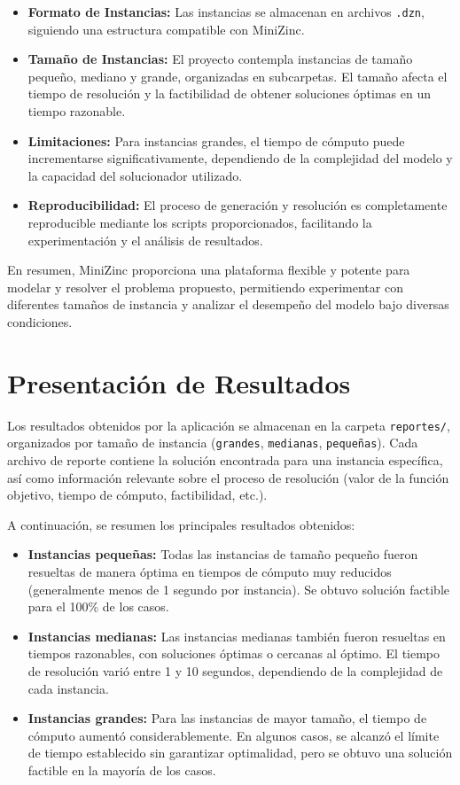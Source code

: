 \documentclass[a4paper,12pt]{article}
\begin{document}
\begin{itemize}
    \item \textbf{Formato de Instancias:} Las instancias se almacenan en archivos \texttt{.dzn}, siguiendo una estructura compatible con MiniZinc.
    \item \textbf{Tamaño de Instancias:} El proyecto contempla instancias de tamaño pequeño, mediano y grande, organizadas en subcarpetas. El tamaño afecta el tiempo de resolución y la factibilidad de obtener soluciones óptimas en un tiempo razonable.
    \item \textbf{Limitaciones:} Para instancias grandes, el tiempo de cómputo puede incrementarse significativamente, dependiendo de la complejidad del modelo y la capacidad del solucionador utilizado.
    \item \textbf{Reproducibilidad:} El proceso de generación y resolución es completamente reproducible mediante los scripts proporcionados, facilitando la experimentación y el análisis de resultados.
\end{itemize}

En resumen, MiniZinc proporciona una plataforma flexible y potente para modelar y resolver el problema propuesto, permitiendo experimentar con diferentes tamaños de instancia y analizar el desempeño del modelo bajo diversas condiciones.

\section{Presentación de Resultados}
Los resultados obtenidos por la aplicación se almacenan en la carpeta \texttt{reportes/}, organizados por tamaño de instancia (\texttt{grandes}, \texttt{medianas}, \texttt{pequeñas}). Cada archivo de reporte contiene la solución encontrada para una instancia específica, así como información relevante sobre el proceso de resolución (valor de la función objetivo, tiempo de cómputo, factibilidad, etc.).

A continuación, se resumen los principales resultados obtenidos:

\begin{itemize}
    \item \textbf{Instancias pequeñas:} Todas las instancias de tamaño pequeño fueron resueltas de manera óptima en tiempos de cómputo muy reducidos (generalmente menos de 1 segundo por instancia). Se obtuvo solución factible para el 100\% de los casos.
    \item \textbf{Instancias medianas:} Las instancias medianas también fueron resueltas en tiempos razonables, con soluciones óptimas o cercanas al óptimo. El tiempo de resolución varió entre 1 y 10 segundos, dependiendo de la complejidad de cada instancia.
    \item \textbf{Instancias grandes:} Para las instancias de mayor tamaño, el tiempo de cómputo aumentó considerablemente. En algunos casos, se alcanzó el límite de tiempo establecido sin garantizar optimalidad, pero se obtuvo una solución factible en la mayoría de los casos.
\end{itemize}
\end{document}
